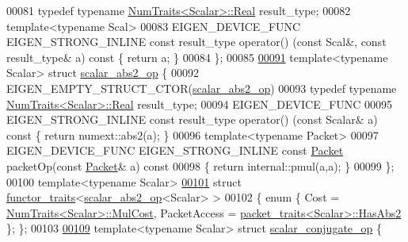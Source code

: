 \begin{DoxyCode}
00081   \textcolor{keyword}{typedef} \textcolor{keyword}{typename} \hyperlink{group___core___module_struct_eigen_1_1_num_traits}{NumTraits<Scalar>::Real} result\_type;
00082   \textcolor{keyword}{template}<\textcolor{keyword}{typename} Scal>
00083   EIGEN\_DEVICE\_FUNC EIGEN\_STRONG\_INLINE \textcolor{keyword}{const} result\_type operator() (\textcolor{keyword}{const} Scal&, \textcolor{keyword}{const} result\_type& a)\textcolor{keyword}{
       const }\{ \textcolor{keywordflow}{return} a; \}
00084 \};
00085 
\hyperlink{struct_eigen_1_1internal_1_1scalar__abs2__op}{00091} \textcolor{keyword}{template}<\textcolor{keyword}{typename} Scalar> \textcolor{keyword}{struct }\hyperlink{struct_eigen_1_1internal_1_1scalar__abs2__op}{scalar\_abs2\_op} \{
00092   EIGEN\_EMPTY\_STRUCT\_CTOR(\hyperlink{struct_eigen_1_1internal_1_1scalar__abs2__op}{scalar\_abs2\_op})
00093   \textcolor{keyword}{typedef} \textcolor{keyword}{typename} \hyperlink{group___core___module_struct_eigen_1_1_num_traits}{NumTraits<Scalar>::Real} result\_type;
00094   EIGEN\_DEVICE\_FUNC
00095   EIGEN\_STRONG\_INLINE \textcolor{keyword}{const} result\_type operator() (\textcolor{keyword}{const} Scalar& a)\textcolor{keyword}{ const }\{ \textcolor{keywordflow}{return} numext::abs2(a); \}
00096   \textcolor{keyword}{template}<\textcolor{keyword}{typename} Packet>
00097   EIGEN\_DEVICE\_FUNC EIGEN\_STRONG\_INLINE \textcolor{keyword}{const} \hyperlink{union_eigen_1_1internal_1_1_packet}{Packet} packetOp(\textcolor{keyword}{const} \hyperlink{union_eigen_1_1internal_1_1_packet}{Packet}& a)\textcolor{keyword}{ const}
00098 \textcolor{keyword}{  }\{ \textcolor{keywordflow}{return} internal::pmul(a,a); \}
00099 \};
00100 \textcolor{keyword}{template}<\textcolor{keyword}{typename} Scalar>
\hyperlink{struct_eigen_1_1internal_1_1functor__traits_3_01scalar__abs2__op_3_01_scalar_01_4_01_4}{00101} \textcolor{keyword}{struct }\hyperlink{struct_eigen_1_1internal_1_1functor__traits}{functor\_traits}<\hyperlink{struct_eigen_1_1internal_1_1scalar__abs2__op}{scalar\_abs2\_op}<Scalar> >
00102 \{ \textcolor{keyword}{enum} \{ Cost = \hyperlink{group___core___module_struct_eigen_1_1_num_traits}{NumTraits<Scalar>::MulCost}, PacketAccess = 
      \hyperlink{struct_eigen_1_1internal_1_1packet__traits}{packet\_traits<Scalar>::HasAbs2} \}; \};
00103 
\hyperlink{struct_eigen_1_1internal_1_1scalar__conjugate__op}{00109} \textcolor{keyword}{template}<\textcolor{keyword}{typename} Scalar> \textcolor{keyword}{struct }\hyperlink{struct_eigen_1_1internal_1_1scalar__conjugate__op}{scalar\_conjugate\_op} \{

\end{DoxyCode}
